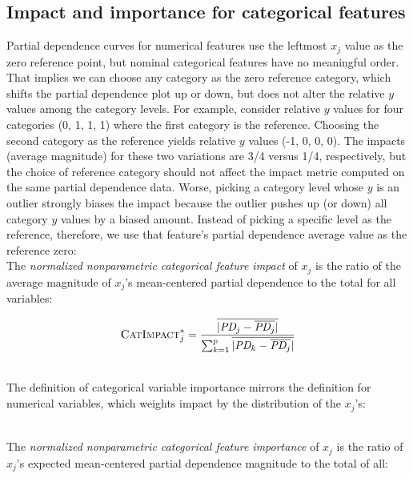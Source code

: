 \documentclass[smallextended]{svjour3}       %
\newcommand{\CImp}{\fontfamily{cmr}\textsc{CatImpact}}
\begin{document}
\subsection{Impact and importance for categorical features}

Partial dependence curves for numerical features use the leftmost $x_j$ value as the zero reference point, but nominal categorical features have no meaningful order. That implies we can choose any category as the zero reference category, which shifts the partial dependence plot up or down, but does not alter the relative $y$ values among the category levels. For example, consider relative $y$ values for four categories (0, 1, 1, 1) where the first category is the reference.  Choosing the second category as the reference yields relative $y$ values (-1, 0, 0, 0). The impacts (average magnitude) for these two variations are 3/4 versus 1/4, respectively, but the choice of reference category should not affect the impact metric computed on the same partial dependence data. Worse, picking a category level whose $y$ is an outlier strongly biases the impact because the outlier pushes up (or down) all category $y$ values by a biased amount.  Instead of picking a specific level as the reference, therefore, we use that feature's partial dependence average value as the reference zero:\\

 The {\em normalized nonparametric categorical feature impact} of $x_j$ is the ratio of the average magnitude of $x_j$'s mean-centered partial dependence to the total for all variables:

\begin{equation}\label{eq:Cpd4a}
\CImp_j^{*} = \frac{\overline{|\text{\it PD}_j - \overline{\text{\it PD}_j}|}}{\sum_{k=1}^p \overline{|\text{\it PD}_k - \overline{\text{\it PD}_j}|}}
\end{equation}

~\\

\noindent The definition of categorical variable importance mirrors the definition for numerical variables, which weights impact by the distribution of the $x_j$'s:

~\\

 The {\em normalized nonparametric categorical feature importance} of $x_j$ is the ratio of $x_j$'s expected mean-centered partial dependence magnitude to the total of all:
\end{document}
